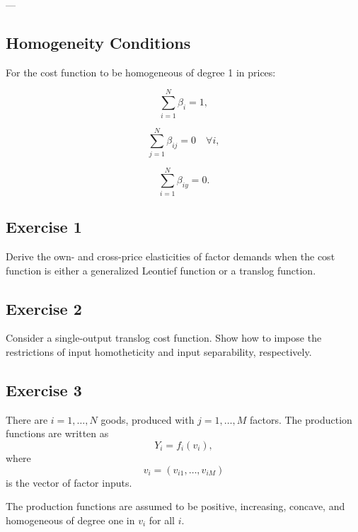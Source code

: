 ---

\subsection*{Homogeneity Conditions}

For the cost function to be homogeneous of degree 1 in prices:

\[
\sum_{i=1}^N \beta_i = 1,
\]

\[
\sum_{j=1}^N \beta_{ij} = 0 \quad \forall i,
\]

\[
\sum_{i=1}^N \beta_{iy} = 0.
\]


\begin{tcolorbox}

\subsection*{Exercise 1}

Derive the own- and cross-price elasticities of factor demands when the
cost function is either a generalized Leontief function or a translog function.

\end{tcolorbox}

\begin{tcolorbox}

\subsection*{Exercise 2}

Consider a single-output translog cost function.
Show how to impose the restrictions of input homotheticity and input separability,
respectively.

\end{tcolorbox}

\begin{tcolorbox}

\subsection*{Exercise 3}

There are $i=1,\dots,N$ goods, produced with $j=1,\dots,M$ factors.
The production functions are written as
\[
Y_i = f_i(v_i),
\]
where
\[
v_i = (v_{i1},\dots,v_{iM})
\]
is the vector of factor inputs.

\end{tcolorbox}


The production functions are assumed to be positive, increasing, concave,
and homogeneous of degree one in $v_i$ for all $i$.

